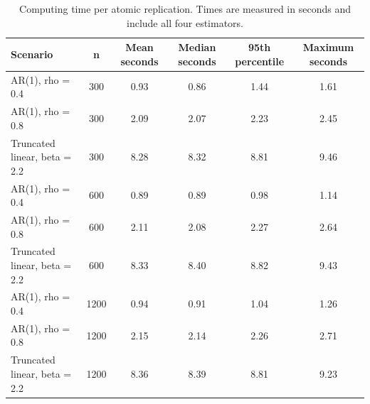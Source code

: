\begin{table}[!htbp]
\small
\centering
\caption{Computing time per atomic replication. Times are measured in seconds and include all four estimators.}
\label{tab:computing-time}
\begin{tabular}{lccccc}
\toprule
Scenario & n & Mean seconds & Median seconds & 95th percentile & Maximum seconds \\
\midrule
AR(1), rho = 0.4 & 300 & 0.93 & 0.86 & 1.44 & 1.61 \\
AR(1), rho = 0.8 & 300 & 2.09 & 2.07 & 2.23 & 2.45 \\
Truncated linear, beta = 2.2 & 300 & 8.28 & 8.32 & 8.81 & 9.46 \\
AR(1), rho = 0.4 & 600 & 0.89 & 0.89 & 0.98 & 1.14 \\
AR(1), rho = 0.8 & 600 & 2.11 & 2.08 & 2.27 & 2.64 \\
Truncated linear, beta = 2.2 & 600 & 8.33 & 8.40 & 8.82 & 9.43 \\
AR(1), rho = 0.4 & 1200 & 0.94 & 0.91 & 1.04 & 1.26 \\
AR(1), rho = 0.8 & 1200 & 2.15 & 2.14 & 2.26 & 2.71 \\
Truncated linear, beta = 2.2 & 1200 & 8.36 & 8.39 & 8.81 & 9.23 \\
\bottomrule
\end{tabular}
\end{table}

